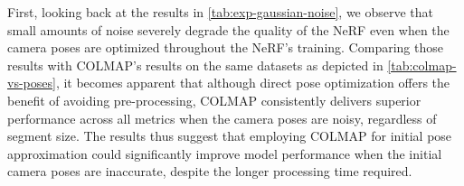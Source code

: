 First, looking back at the results in \autoref{tab:exp-gaussian-noise}, we observe that small amounts of noise severely degrade the quality of the NeRF even when the camera poses are optimized throughout the NeRF's training. Comparing those results with COLMAP's results on the same datasets as depicted in \autoref{tab:colmap-vs-poses}, it becomes apparent that although direct pose optimization offers the benefit of avoiding pre-processing, COLMAP consistently delivers superior performance across all metrics when the camera poses are noisy, regardless of segment size. The results thus suggest that employing COLMAP for initial pose approximation could significantly improve model performance when the initial camera poses are inaccurate, despite the longer processing time required.


\begin{comment}
This subsection presents an experiment designed to assess the relative merits of two distinct strategies for refining initial camera poses. Specifically, we compare the direct optimization of rough camera poses within the model training pipeline against the pre-processing of such poses with the help of COLMAP. The main question under investigation here is whether the benefits of optimizing the rough camera poses directly can outweigh those of employing a sophisticated SfM tool like COLMAP, despite the potential for a more substantial time investment.

might offer the benefit of faster processing time, COLMAP consistently delivers superior performance across all metrics, regardless of segment size.
COLMAP doesn't optimize initial poses, but instead approximates camera poses from a set of input images. 
Comparing those results with \autoref{tab:colmap-vs-poses}, we observe that the runs with poses approximated by COLMAP deliver superior performance
Comparing the results in \autoref{tab:colmap-vs-poses} and \autoref{tab:exp-gaussian-noise} it becomes apparent that although direct pose optimization might offer the benefit of faster processing time, COLMAP consistently delivers superior performance across all metrics, regardless of segment size. The results thus suggest that employing COLMAP for initial pose refinement could significantly improve model performance when the initial camera poses are inaccurate, despite the longer processing time required.
\end{comment}














